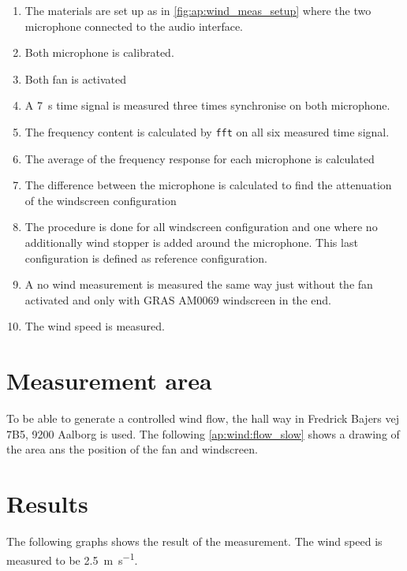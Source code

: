\begin{enumerate}
\item The materials are set up as in \autoref{fig:ap:wind_meas_setup} where the two microphone connected to the audio interface.
\item Both microphone is calibrated.
\item Both fan is activated 
\item A \SI{7}{\second} time signal is measured three times synchronise on both microphone.
\item The frequency content is calculated by \texttt{fft} on all six measured time signal.
\item The average of the frequency response for each microphone is calculated
\item The difference between the microphone is calculated to find the attenuation of the windscreen configuration
\item The procedure is done for all windscreen configuration and one where no additionally wind stopper is added around the microphone. This last configuration is defined as reference configuration.
\item A no wind measurement is measured the same way just without the fan activated and only with GRAS AM0069 windscreen in the end.
\item The wind speed is measured.
\end{enumerate}

\section*{Measurement area}
To be able to generate a controlled wind flow, the hall way in Fredrick Bajers vej 7B5, 9200 Aalborg is used. The following \autoref{ap:wind:flow_slow} shows a drawing of the area ans the position of the fan and windscreen.


\section*{Results}

The following graphs shows the result of the measurement. The wind speed is measured to be \SI{2.5}{\meter\per\second}. 




